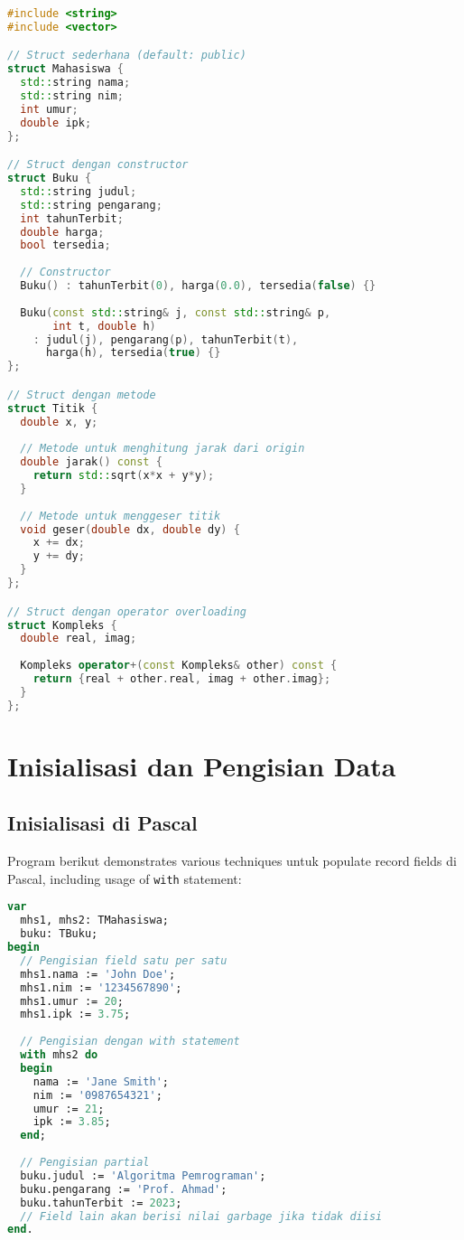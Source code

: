 \documentclass[../main.tex]{subfiles}
\begin{document}
\begin{lstlisting}[language=C++, caption={Deklarasi struct di C++}]
#include <string>
#include <vector>

// Struct sederhana (default: public)
struct Mahasiswa {
  std::string nama;
  std::string nim;
  int umur;
  double ipk;
};

// Struct dengan constructor
struct Buku {
  std::string judul;
  std::string pengarang;
  int tahunTerbit;
  double harga;
  bool tersedia;
  
  // Constructor
  Buku() : tahunTerbit(0), harga(0.0), tersedia(false) {}
  
  Buku(const std::string& j, const std::string& p, 
       int t, double h) 
    : judul(j), pengarang(p), tahunTerbit(t), 
      harga(h), tersedia(true) {}
};

// Struct dengan metode
struct Titik {
  double x, y;
  
  // Metode untuk menghitung jarak dari origin
  double jarak() const {
    return std::sqrt(x*x + y*y);
  }
  
  // Metode untuk menggeser titik
  void geser(double dx, double dy) {
    x += dx;
    y += dy;
  }
};

// Struct dengan operator overloading
struct Kompleks {
  double real, imag;
  
  Kompleks operator+(const Kompleks& other) const {
    return {real + other.real, imag + other.imag};
  }
};
\end{lstlisting}

\section{Inisialisasi dan Pengisian Data}

\subsection{Inisialisasi di Pascal}

Program berikut demonstrates various techniques untuk populate record fields di Pascal, including usage of \texttt{with} statement:

\begin{lstlisting}[language=Pascal, caption={Inisialisasi record di Pascal}]
var
  mhs1, mhs2: TMahasiswa;
  buku: TBuku;
begin
  // Pengisian field satu per satu
  mhs1.nama := 'John Doe';
  mhs1.nim := '1234567890';
  mhs1.umur := 20;
  mhs1.ipk := 3.75;
  
  // Pengisian dengan with statement
  with mhs2 do
  begin
    nama := 'Jane Smith';
    nim := '0987654321';
    umur := 21;
    ipk := 3.85;
  end;
  
  // Pengisian partial
  buku.judul := 'Algoritma Pemrograman';
  buku.pengarang := 'Prof. Ahmad';
  buku.tahunTerbit := 2023;
  // Field lain akan berisi nilai garbage jika tidak diisi
end.
\end{lstlisting}
\end{document}
